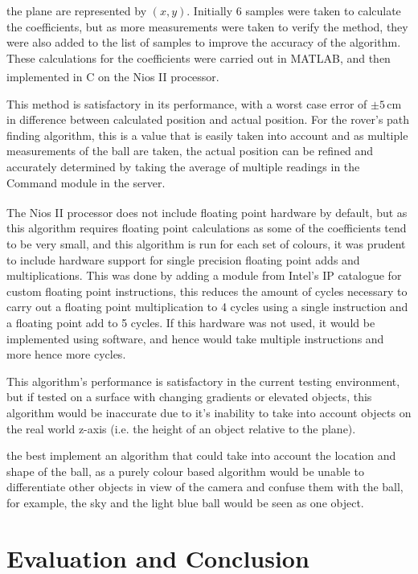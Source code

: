 \documentclass[a4paper]{article}
\newcommand{\unit}[1]{\ensuremath{\, \mathrm{#1}}}
\begin{document}
the plane are represented by \((x,y)\). Initially 6 samples were taken to calculate 
the coefficients, but as more measurements were taken to verify the method, they
were also added to the list of samples to improve the accuracy of the algorithm.
These calculations for the coefficients were carried out in MATLAB, and then 
implemented in C on the Nios\textsuperscript{\textregistered} II processor. 

This method is satisfactory in its performance, with a worst case error of \(\pm5\unit{cm}\)
in difference between calculated position and actual position. For the rover's 
path finding algorithm, this is a value that is easily taken into account and as
multiple measurements of the ball are taken, the actual position can be refined 
and accurately determined by taking the average of multiple readings in the 
Command module in the server. 

The Nios\textsuperscript{\textregistered} II processor does not include floating point hardware by default, but as 
this algorithm requires floating point calculations as some of the coefficients 
tend to be very small, and this algorithm is run for each set of colours, it was
prudent to include hardware support for single precision floating point adds 
and multiplications. This was done by adding a module from Intel's IP catalogue 
for custom floating point instructions, this reduces the amount of cycles 
necessary to carry out a floating point multiplication to 4 cycles using a single
instruction and a floating point add to 5 cycles\cite{NiosIICustomInstruction}.
If this hardware was not used, it would be implemented using software, and hence
would take multiple instructions and more hence more cycles. 

This algorithm's performance is satisfactory in the current testing environment, 
but if tested on a surface with changing gradients or elevated objects, this algorithm
would be inaccurate due to it's inability to take into account objects on the real
world z-axis (i.e. the height of an object relative to the plane).  


the best implement an algorithm that could take into account the location 
and shape of the ball, as a purely colour based algorithm would be unable to 
differentiate other objects in view of the camera and confuse them with the ball, 
for example, the sky and the light blue ball would be seen as one object.


\section{Evaluation and Conclusion}
\end{document}
